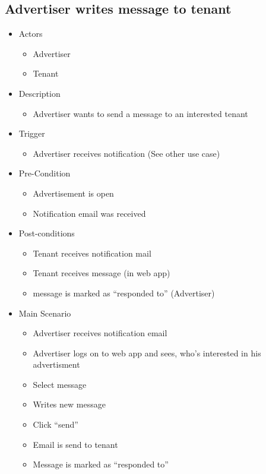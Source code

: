 \documentclass[a4paper,11pt]{article}
\begin{document}
\subsection*{Advertiser writes message to tenant}
\begin{itemize}
  \item Actors
    \begin{itemize}
      \item Advertiser
      \item Tenant
    \end{itemize}
  \item Description
    \begin{itemize}
      \item Advertiser wants to send a message to an interested tenant
    \end{itemize}
  \item Trigger
    \begin{itemize}
      \item Advertiser receives notification (See other use case)
    \end{itemize}
  \item Pre-Condition
    \begin{itemize}
      \item Advertisement is open
      \item Notification email was received
    \end{itemize}
  \item Post-conditions
    \begin{itemize}
      \item Tenant receives notification mail
      \item Tenant receives message (in web app)
      \item message is marked as “responded to” (Advertiser)
    \end{itemize}
  \item Main Scenario
    \begin{itemize}
      \item Advertiser receives notification email
      \item Advertiser logs on to web app and sees, who's interested in his advertisment
      \item Select message
      \item Writes new message
      \item Click “send”
      \item Email is send to tenant 
      \item Message is marked as “responded to”
    \end{itemize}
\end{itemize}
\end{document}
